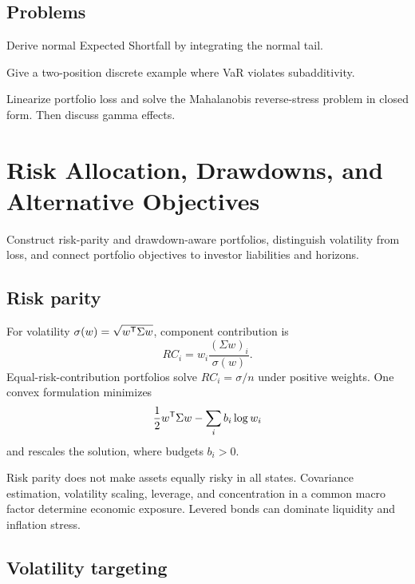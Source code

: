 \section{Problems}

\begin{exercise}[Core: ES]
Derive normal Expected Shortfall by integrating the normal tail.
\end{exercise}
\begin{exercise}
Give a two-position discrete example where VaR violates subadditivity.
\end{exercise}
\begin{exercise}
Linearize portfolio loss and solve the Mahalanobis reverse-stress problem in closed
form. Then discuss gamma effects.
\end{exercise}


\chapter{Risk Allocation, Drawdowns, and Alternative Objectives}

\begin{objectives}
Construct risk-parity and drawdown-aware portfolios, distinguish volatility from
loss, and connect portfolio objectives to investor liabilities and horizons.
\end{objectives}

\section{Risk parity}

For volatility $\sigma(w)=\sqrt{w^\mathsf T\Sigma w}$, component contribution is
\[
RC_i=w_i\frac{(\Sigma w)_i}{\sigma(w)}.
\]
Equal-risk-contribution portfolios solve $RC_i=\sigma/n$ under positive weights.
One convex formulation minimizes
\[
\frac12w^\mathsf T\Sigma w-\sum_i b_i\log w_i
\]
and rescales the solution, where budgets $b_i>0$.

Risk parity does not make assets equally risky in all states. Covariance estimation,
volatility scaling, leverage, and concentration in a common macro factor determine
economic exposure. Levered bonds can dominate liquidity and inflation stress.

\section{Volatility targeting}

